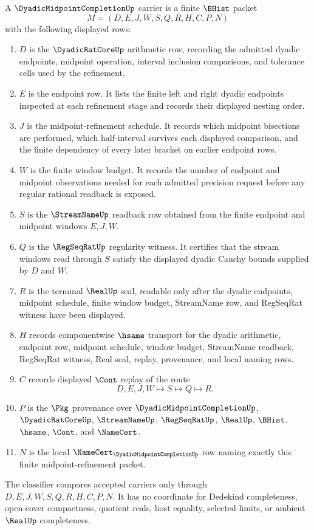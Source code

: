 \begin{definition}
\label{def:dyadic-midpoint-completion-carrier}
A $\DyadicMidpointCompletionUp$ carrier is a finite $\BHist$ packet
$$
M=(D,E,J,W,S,Q,R,H,C,P,N)
$$
with the following displayed rows:
\begin{enumerate}
\item $D$ is the $\DyadicRatCoreUp$ arithmetic row, recording the admitted dyadic endpoints, midpoint operation, interval inclusion comparisons, and tolerance cells used by the refinement.
\item $E$ is the endpoint row. It lists the finite left and right dyadic endpoints inspected at each refinement stage and records their displayed nesting order.
\item $J$ is the midpoint-refinement schedule. It records which midpoint bisections are performed, which half-interval survives each displayed comparison, and the finite dependency of every later bracket on earlier endpoint rows.
\item $W$ is the finite window budget. It records the number of endpoint and midpoint observations needed for each admitted precision request before any regular rational readback is exposed.
\item $S$ is the $\StreamNameUp$ readback row obtained from the finite endpoint and midpoint windows $E,J,W$.
\item $Q$ is the $\RegSeqRatUp$ regularity witness. It certifies that the stream windows read through $S$ satisfy the displayed dyadic Cauchy bounds supplied by $D$ and $W$.
\item $R$ is the terminal $\RealUp$ seal, readable only after the dyadic endpoints, midpoint schedule, finite window budget, StreamName row, and RegSeqRat witness have been displayed.
\item $H$ records componentwise $\hsame$ transport for the dyadic arithmetic, endpoint row, midpoint schedule, window budget, StreamName readback, RegSeqRat witness, Real seal, replay, provenance, and local naming rows.
\item $C$ records displayed $\Cont$ replay of the route
$$
D,E,J,W \longmapsto S \longmapsto Q \longmapsto R .
$$
\item $P$ is the $\Pkg$ provenance over $\DyadicMidpointCompletionUp$, $\DyadicRatCoreUp$, $\StreamNameUp$, $\RegSeqRatUp$, $\RealUp$, $\BHist$, $\hsame$, $\Cont$, and $\NameCert$.
\item $N$ is the local $\NameCert_{\DyadicMidpointCompletionUp}$ row naming exactly this finite midpoint-refinement packet.
\end{enumerate}
The classifier compares accepted carriers only through $D,E,J,W,S,Q,R,H,C,P,N$. It has no coordinate for Dedekind completeness, open-cover compactness, quotient reals, host equality, selected limits, or ambient $\RealUp$ completeness.
\end{definition}

